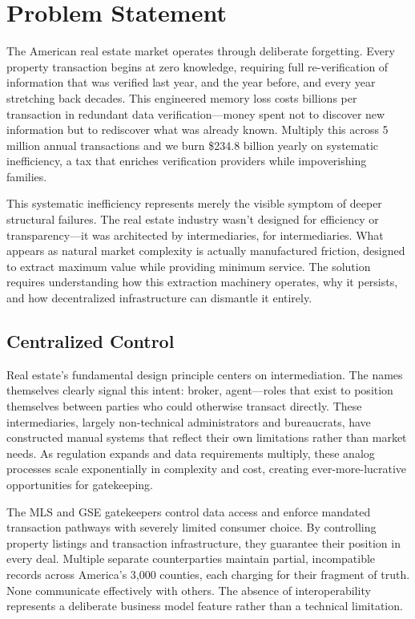 \chapter{Problem Statement}

The American real estate market operates through deliberate forgetting. Every property transaction begins at zero knowledge, requiring full re-verification of information that was verified last year, and the year before, and every year stretching back decades. This engineered memory loss costs billions per transaction in redundant data verification---money spent not to discover new information but to rediscover what was already known. Multiply this across 5 million annual transactions and we burn \$234.8 billion yearly on systematic inefficiency, a tax that enriches verification providers while impoverishing families.

This systematic inefficiency represents merely the visible symptom of deeper structural failures. The real estate industry wasn't designed for efficiency or transparency---it was architected by intermediaries, for intermediaries. What appears as natural market complexity is actually manufactured friction, designed to extract maximum value while providing minimum service. The solution requires understanding how this extraction machinery operates, why it persists, and how decentralized infrastructure can dismantle it entirely.

\section{Centralized Control}

Real estate's fundamental design principle centers on intermediation. The names themselves clearly signal this intent: broker, agent---roles that exist to position themselves between parties who could otherwise transact directly. These intermediaries, largely non-technical administrators and bureaucrats, have constructed manual systems that reflect their own limitations rather than market needs. As regulation expands and data requirements multiply, these analog processes scale exponentially in complexity and cost, creating ever-more-lucrative opportunities for gatekeeping.

The MLS and GSE gatekeepers control data access and enforce mandated transaction pathways with severely limited consumer choice. By controlling property listings and transaction infrastructure, they guarantee their position in every deal. Multiple separate counterparties maintain partial, incompatible records across America's 3,000 counties, each charging for their fragment of truth. None communicate effectively with others. The absence of interoperability represents a deliberate business model feature rather than a technical limitation.

